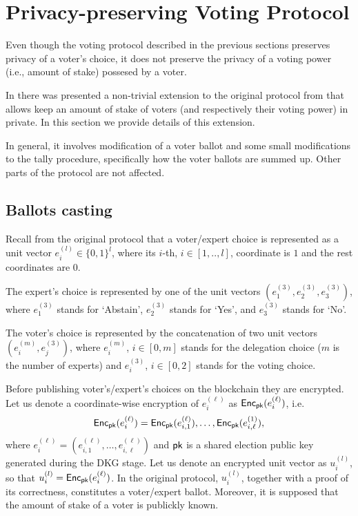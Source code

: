 \section{Privacy-preserving Voting Protocol}

Even though the voting protocol described in the previous sections preserves privacy of a voter's choice, it does not preserve the privacy of a voting power (i.e., amount of stake) possesed by a voter.

In \cite{ZBO20} there was presented a non-trivial extension to the original protocol from \cite{ZOB18} that allows keep an amount of stake of voters (and respectively their voting power) in private. In this section we provide details of this extension.

In general, it involves modification of a voter ballot and some small modifications to the tally procedure, specifically how the voter ballots are summed up. Other parts of the protocol are not affected.

\subsection{Ballots casting}

Recall from the original protocol that a voter/expert choice is represented as a unit vector $e^{(l)}_i \in \{0,1\}^{l}$, where its $i$-th, $i \in [1,..,l]$, coordinate is $1$ and the rest coordinates are $0$.

The expert's choice  is represented by one of the unit vectors $(e^{(3)}_1, e^{(3)}_2, e^{(3)}_3)$, where $e^{(3)}_1$ stands for `Abstain', $e^{(3)}_2$ stands for `Yes', and $e^{(3)}_3$ stands for `No'.

The voter's choice is represented by the concatenation of two  unit vectors $( e^{(m)}_i , e^{(3)}_j )$, where $e^{(m)}_i$, $i\in[0,m]$ stands for the delegation choice ($m$ is the number of experts) and $e^{(3)}_i$, $i\in[0,2]$ stands for the voting choice.

Before publishing voter's/expert's choices on the blockchain they are encrypted. Let us denote a coordinate-wise encryption of $e^{(\ell)}_i$ as $\mathsf{Enc}_{\mathsf{pk}}(e^{(\ell)}_i )$, i.e. 
\[\mathsf{Enc}_{\mathsf{pk}}(e^{(\ell)}_i ) = \mathsf{Enc}_{\mathsf{pk}}(e^{(\ell)}_{i,1}), \ldots, \mathsf{Enc}_{\mathsf{pk}}(e^{(1)}_{i,\ell}),\]
where $e^{(\ell)}_i = (e^{(\ell)}_{i,1},\ldots, e^{(\ell)}_{i,\ell})$ and $\mathsf{pk}$ is a shared election public key generated during the DKG stage. Let us denote an encrypted unit vector as $u^{(l)}_i$, so that $u^{(l)}_{i}=\mathsf{Enc}_{\mathsf{pk}}(e^{(\ell)}_{i})$. In the original protocol, $u^{(l)}_i$, together with a proof of its correctness, constitutes a voter/expert ballot. Moreover, it is supposed that the amount of stake of a voter is publickly known.

